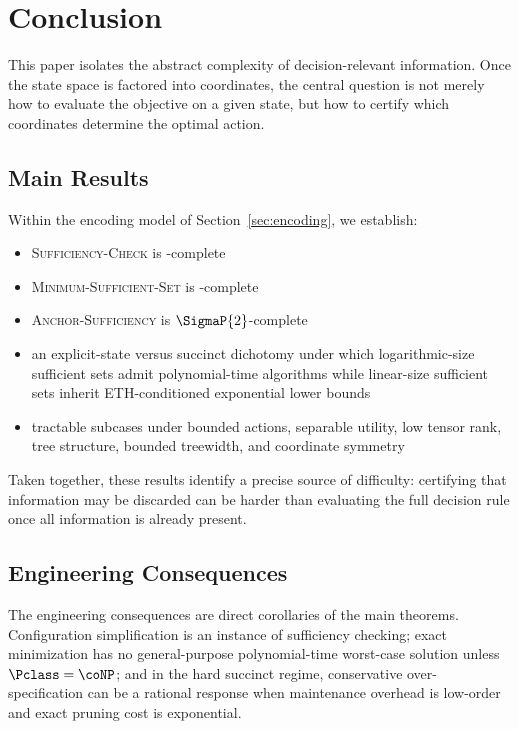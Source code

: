 \section{Conclusion}

This paper isolates the abstract complexity of decision-relevant information. Once the state space is factored into coordinates, the central question is not merely how to evaluate the objective on a given state, but how to certify which coordinates determine the optimal action.

\subsection*{Main Results}

Within the encoding model of Section~\ref{sec:encoding}, we establish:
\begin{itemize}
\item \textsc{Sufficiency-Check} is \coNP-complete
\item \textsc{Minimum-Sufficient-Set} is \coNP-complete
\item \textsc{Anchor-Sufficiency} is $\SigmaP{2}$-complete
\item an explicit-state versus succinct dichotomy under which logarithmic-size sufficient sets admit polynomial-time algorithms while linear-size sufficient sets inherit ETH-conditioned exponential lower bounds
\item tractable subcases under bounded actions, separable utility, low tensor rank, tree structure, bounded treewidth, and coordinate symmetry
\end{itemize}

Taken together, these results identify a precise source of difficulty: certifying that information may be discarded can be harder than evaluating the full decision rule once all information is already present.

\subsection*{Engineering Consequences}

The engineering consequences are direct corollaries of the main theorems. Configuration simplification is an instance of sufficiency checking; exact minimization has no general-purpose polynomial-time worst-case solution unless $\Pclass=\coNP$; and in the hard succinct regime, conservative over-specification can be a rational response when maintenance overhead is low-order and exact pruning cost is exponential.

